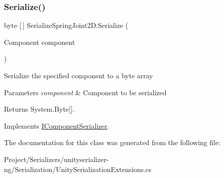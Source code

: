 \subsubsection{\texorpdfstring{Serialize()}{Serialize()}}
{\footnotesize\ttfamily byte \mbox{[}$\,$\mbox{]} Serialize\+Spring\+Joint2\+D.\+Serialize (\begin{DoxyParamCaption}\item[{Component}]{component }\end{DoxyParamCaption})\hspace{0.3cm}{\ttfamily [inline]}}



Serialize the specified component to a byte array 


\begin{DoxyParams}{Parameters}
{\em component} & Component to be serialized\\
\hline
\end{DoxyParams}
\begin{DoxyReturn}{Returns}
System.\+Byte\mbox{[}\mbox{]}.
\end{DoxyReturn}


Implements \hyperlink{interface_i_component_serializer_ab2aa38005665496b62d6c54b5f0dbd31}{I\+Component\+Serializer}.



The documentation for this class was generated from the following file\+:\begin{DoxyCompactItemize}
\item 
Project/\+Serializers/unityserializer-\/ng/\+Serialization/Unity\+Serialization\+Extensions.\+cs\end{DoxyCompactItemize}
